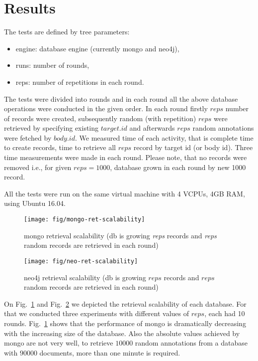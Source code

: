 \documentclass[a4paper,10pt]{article}
\begin{document}
\section{Results}
The tests are defined by tree parameters:
\begin{itemize}
 \item engine: database engine (currently mongo and neo4j),
 \item runs: number of rounds, 
 \item reps: number of repetitions in each round.
\end{itemize}
The tests were divided into rounds and in each round all the above database 
operations were conducted in the given order. In each round firstly $reps$ 
number of records were created, subsequently random (with repetition) $reps$ 
were retrieved by specifying existing $target.id$ and afterwards $reps$ 
random annotations were fetched by $body.id$. We measured time of each 
activity, that is complete time to create records, time to retrieve all $reps$ 
record by target id (or body id). Three time measurements were made in each 
round. Please note, that no records were removed i.e., for given $reps = 1000$, 
database grown in each round by new 1000 record. 

All the tests were run on the same virtual machine with 4 VCPUs, 4GB RAM, using
Ubuntu 16.04. 


\begin{figure}
\centering
 \texttt{[image: fig/mongo-ret-scalability]} 
 \caption{mongo retrieval scalability (db is growing \emph{reps} records and \emph{reps} random records are retrieved in each round)} \label{fig:mongo-ret}
\end{figure}


\begin{figure}
\centering
 \texttt{[image: fig/neo-ret-scalability]}
 \caption{neo4j retrieval scalability (db is growing $reps$ records and $reps$ random records are retrieved in each round)} \label{fig:neo-ret}
\end{figure}

On Fig.~\ref{fig:mongo-ret} and Fig.~\ref{fig:neo-ret} we depicted the retrieval 
scalability of each database. For that we conducted three experiments with 
different values of $reps$, each had 10 rounds. Fig.~\ref{fig:mongo-ret} shows 
that the performance of mongo is dramatically decreasing with the increasing 
size of the database. Also the absolute values achieved by mongo are not very 
well, to retrieve $10000$ random annotations from a database with $90 000$ 
documents, more than one minute is required. 
\end{document}
